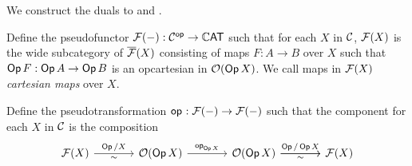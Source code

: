We construct the duals to  and .
\begin{definition}
  Define the pseudofunctor ${\mathcal{F}}(-) : \mathcal{C}^{\mathsf{op}} \to \mathbb{C}\mathsf{AT}$ such that
  for each $X$ in $\mathcal{C}$, ${\mathcal{F}}(X)$ is the wide subcategory of ${\overline{{\mathcal{F}}}}(X)$ consisting of maps
  $F : A \to B$ over $X$ such that $\mathop{\mathsf{Op}} F : \mathop{\mathsf{Op}} A \to \mathop{\mathsf{Op}} B$ is
  an opcartesian in ${\mathcal{O}}(\mathop{\mathsf{Op}} X)$.
  We call maps in ${\mathcal{F}}(X)$ \emph{cartesian maps} over $X$.

  Define the pseudotransformation $\mathop{\mathsf{op}_{}} : {\mathcal{F}}(-) \to {\mathcal{F}}(-)$
  such that the component for each $X$ in $\mathcal{C}$ is the composition
  \[ \begin{tikzcd}[column sep = large]
    {\fibcart(X)} & {\opfibcart (\Op X)} & {\opfibcart (\Op X)} & {\fibcart(X)}
    \arrow["{\Op / X}", from=1-1, to=1-2]
    \arrow["\sim"', draw=none, from=1-1, to=1-2]
    \arrow["{\vOp[\Op X]{}}", from=1-2, to=1-3]
    \arrow["{\Op / \Op X}", from=1-3, to=1-4]
    \arrow["\sim"', from=1-3, to=1-4]
  \end{tikzcd} \]
\end{definition}

